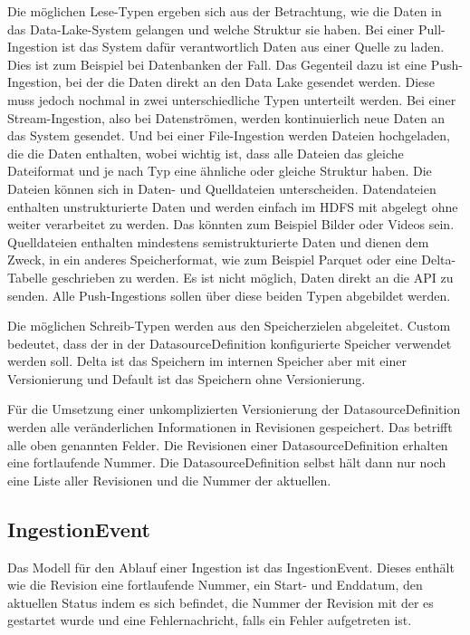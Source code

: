 Die möglichen Lese-Typen ergeben sich aus der Betrachtung, wie die Daten in das Data-Lake-System gelangen und welche Struktur sie haben.
Bei einer Pull-Ingestion ist das System dafür verantwortlich Daten aus einer Quelle zu laden.
Dies ist zum Beispiel bei Datenbanken der Fall.
Das Gegenteil dazu ist eine Push-Ingestion, bei der die Daten direkt an den Data Lake gesendet werden.
Diese muss jedoch nochmal in zwei unterschiedliche Typen unterteilt werden.
Bei einer Stream-Ingestion, also bei Datenströmen, werden kontinuierlich neue Daten an das System gesendet.
Und bei einer File-Ingestion werden Dateien hochgeladen, die die Daten enthalten, wobei wichtig ist, dass alle Dateien das gleiche Dateiformat und je nach Typ eine ähnliche oder gleiche Struktur haben.
Die Dateien können sich in Daten- und Quelldateien unterscheiden.
Datendateien enthalten unstrukturierte Daten und werden einfach im HDFS mit abgelegt ohne weiter verarbeitet zu werden.
Das könnten zum Beispiel Bilder oder Videos sein.
Quelldateien enthalten mindestens semistrukturierte Daten und dienen dem Zweck, in ein anderes Speicherformat, wie zum Beispiel Parquet oder eine Delta-Tabelle geschrieben zu werden.
Es ist nicht möglich, Daten direkt an die API zu senden.
Alle Push-Ingestions sollen über diese beiden Typen abgebildet werden.

Die möglichen Schreib-Typen werden aus den Speicherzielen abgeleitet.
Custom bedeutet, dass der in der DatasourceDefinition konfigurierte Speicher verwendet werden soll.
Delta ist das Speichern im internen Speicher aber mit einer Versionierung und Default ist das Speichern ohne Versionierung.

Für die Umsetzung einer unkomplizierten Versionierung der DatasourceDefinition werden alle veränderlichen Informationen in Revisionen gespeichert.
Das betrifft alle oben genannten Felder.
Die Revisionen einer DatasourceDefinition erhalten eine fortlaufende Nummer.
Die DatasourceDefinition selbst hält dann nur noch eine Liste aller Revisionen und die Nummer der aktuellen.

\subsection{IngestionEvent}

Das Modell für den Ablauf einer Ingestion ist das IngestionEvent.
Dieses enthält wie die Revision eine fortlaufende Nummer, ein Start- und Enddatum, den aktuellen Status indem es sich befindet, die Nummer der Revision mit der es gestartet wurde und eine Fehlernachricht, falls ein Fehler aufgetreten ist.


